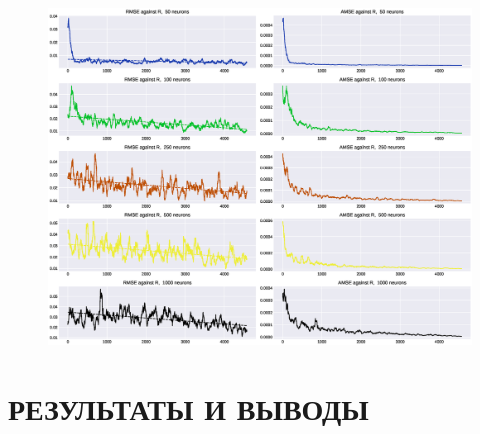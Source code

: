 \documentclass{article}
\begin{document}
\begin{figure}[htp]
\centering
\includegraphics[scale=0.50]{imgs/aenc-errdist_fl.eps}
\caption{}
\label{}
\end{figure}

\section{РЕЗУЛЬТАТЫ И ВЫВОДЫ}
\end{document}
